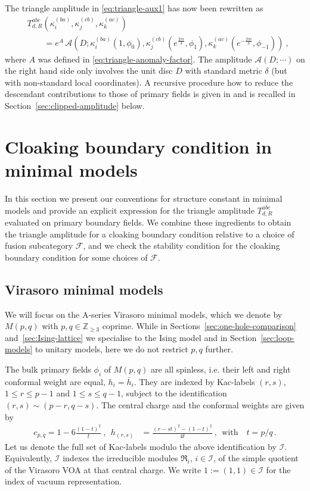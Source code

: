 \documentclass[11pt,a4paper]{article}
\numberwithin{equation}{section}
\begin{document}
\smallskip
The triangle amplitude 
in \eqref{eq:triangle-aux1}
has now been rewritten as
\begin{align}\label{eq:triangle-amplitude-with-anomaly}
    &T_{d,R}^{abc}(\kappa^{(ba)}_i,\kappa^{(cb)}_j,\kappa^{(ac)}_k)
    \nonumber\\
    & \qquad
    = e^A \, \mathcal{A}(D;\kappa^{(ba)}_i(1,\phi_0),\kappa^{(cb)}_j(e^{\frac{2 \pi i}{3}},\phi_1),\kappa^{(ac)}_k(e^{-\frac{2 \pi i}{3}},\phi_{-1}))  \ ,
\end{align}
where $A$ was defined in \eqref{eq:triangle-anomaly-factor}.
The amplitude $\mathcal{A}(D;\cdots)$ on the right hand side only involves the unit disc $D$ with standard metric $\delta$ (but with non-standard local coordinates). A recursive procedure how to reduce the descendant contributions to those of primary fields is given in \cite[Sec.\,6]{Brehm:2021wev} and is recalled in Section~\ref{sec:clipped-amplitude} below.


\section{Cloaking boundary condition in minimal models}\label{sec:cloak-minimal}

In this section we present our conventions for structure constant in minimal models and provide an explicit expression for the triangle amplitude $T_{d,R}^{abc}$ evaluated on primary boundary fields. We combine these ingredients to obtain the triangle amplitude for a cloaking boundary condition relative to a  choice of fusion subcategory $\mathcal{F}$, and we check the stability condition for the cloaking boundary condition for some choices of $\mathcal{F}$.

\subsection{Virasoro minimal models}\label{sec:vir-min-mod}

We will focus on the A-series Virasoro minimal models, which we denote by $M(p,q)$ with $p,q \in \mathbb{Z}_{\ge 3}$ coprime. 
While in Sections~\ref{sec:one-hole-comparison} and~\ref{sec:Ising-lattice} we specialise to the Ising model and in Section~\ref{sec:loop-models} to unitary models, here we do not restrict $p,q$ further. 

\smallskip
The bulk primary fields $\phi_i$ of $M(p,q)$ are all spinless, i.e. their left and right conformal weight are equal, $h_i = \bar{h}_i$. They are indexed by Kac-labels $(r,s)$, $1\le r \le p-1$ and $1\le s \le q-1$, 
subject to the identification $(r,s) \sim (p-r,q-s)$.
The central charge and the conformal weights are given by
\begin{align}\label{eq:MM-c-h}
    c_{p,q} = 1 - 6 \frac{(1-t)^2}{t} ~,~~
    h_{(r,s)} &= \frac{(r-st)^2 -(1-t)^2}{4t}~,~~ \text{with}\quad t=p/q\,.
\end{align}
%
Let us denote the full set of Kac-labels modulo the above identification by $\mathcal{I}$. Equivalently, $\mathcal{I}$ indexes the irreducible modules $\mathfrak{R}_i$, $i \in \mathcal{I}$, of the simple quotient of the Virasoro VOA at that central charge. We write $1 := (1,1) \in \mathcal{I}$ for the index of vacuum representation.
\end{document}
